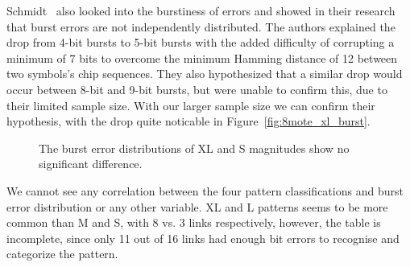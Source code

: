 Schmidt~\etal{} also looked into the burstiness of errors and showed in their research that burst errors are not independently distributed.
The authors explained the drop from 4-bit bursts to 5-bit bursts with the added difficulty of corrupting a minimum of 7 bits to overcome the minimum Hamming distance of 12 between two symbols's chip sequences.
They also hypothesized that a similar drop would occur between 8-bit and 9-bit bursts, but were unable to confirm this, due to their limited sample size.
With our larger sample size we can confirm their hypothesis, with the drop quite noticable in Figure~\ref{fig:8mote_xl_burst}.

\begin{figure}[H]
	\caption{The burst error distributions of XL and S magnitudes show no significant difference.}
	\label{fig:8mote_burst_error}
\end{figure}

We cannot see any correlation between the four pattern classifications and burst error distribution or any other variable.
XL and L patterns seems to be more common than M and S, with 8 vs. 3 links respectively, however, the table is incomplete, since only 11 out of 16 links had enough bit errors to recognise and categorize the pattern.

